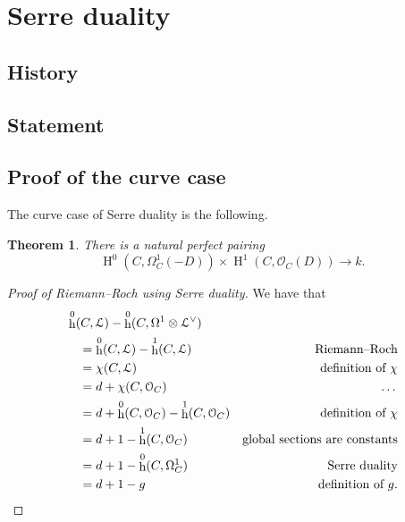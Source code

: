 \documentclass[10pt,a4paper]{article}
\theoremstyle{lecture}
\newtheorem{theorem}{Theorem}
\DeclareMathOperator\hh{h}
\DeclareMathOperator\HH{H}
\begin{document}
\section{Serre duality}
\label{section:serre-duality}
\subsection{History}
\label{subsection-serre-duality-history}

\subsection{Statement}
\label{subsection:serre-duality-statement}

\subsection{Proof of the curve case}
\label{subsection:serre-duality-curves}
The curve case of Serre duality is the following.
\begin{theorem}
  \label{theorem:serre-duality-curves}
  There is a natural perfect pairing
  \begin{equation}
    \HH^0(C,\Omega_C^1(-D))\times\HH^1(C,\mathcal{O}_C(D))\to k.
  \end{equation}
\end{theorem}

\begin{proof}[Proof of Riemann--Roch using Serre duality]
  We have that
  \begin{equation}
    \begin{aligned}
      &\hh^0(C,\mathcal{L})-\hh^0(C,\Omega^1\otimes\mathcal{L}^\vee) \\
      &\quad=\hh^0(C,\mathcal{L})-\hh^1(C,\mathcal{L}) & \text{Riemann--Roch} \\
      &\quad=\chi(C,\mathcal{L}) & \text{definition of~$\chi$} \\
      &\quad=d+\chi(C,\mathcal{O}_C) & \text{\dots} \\
      &\quad=d+\hh^0(C,\mathcal{O}_C)-\hh^1(C,\mathcal{O}_C) & \text{definition of~$\chi$} \\
      &\quad=d+1-\hh^1(C,\mathcal{O}_C) & \text{global sections are constants} \\
      &\quad=d+1-\hh^0(C,\Omega_C^1) & \text{Serre duality} \\
      &\quad=d+1-g & \text{definition of $g$}.
    \end{aligned}
  \end{equation}
\end{proof}
\end{document}
